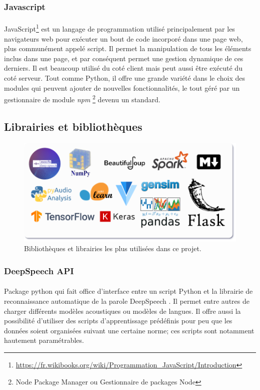 		\subsubsection*{Javascript} 
		\paragraph{}
		JavaScript\footnote{\url{https://fr.wikibooks.org/wiki/Programmation_JavaScript/Introduction}} est un langage de programmation utilisé principalement par les navigateurs web pour exécuter un bout de code incorporé dans une page web, plus communément appelé script. Il permet la manipulation de tous les éléments inclus dans une page, et par conséquent permet une gestion dynamique de ces derniers. Il est beaucoup utilisé du coté client mais peut aussi être exécuté du coté serveur. Tout comme Python, il offre une grande variété dans le choix des modules qui peuvent ajouter de nouvelles fonctionnalités, le tout géré par un gestionnaire de module \textit{npm} \footnote{Node Package Manager ou Gestionnaire de packages Node} devenu un standard.
	
	\subsection{Librairies et bibliothèques}
	\begin{figure}[H] 
		\centering
		\includegraphics[width=0.9\linewidth]{images/implementation/libs_frams.png}
		\caption{Bibliothèques et librairies les plus utilisées dans ce projet.}
		\label{fig:libs_frams}
	\end{figure}
		\subsubsection*{DeepSpeech API}
		\paragraph{}
		Package python qui fait office d'interface entre un script Python et la librairie de reconnaissance automatique de la parole DeepSpeech \citep{deepspeech_paper}. Il permet entre autres de charger différents modèles acoustiques ou modèles de langues. Il offre aussi la possibilité d'utiliser des scripts d'apprentissage prédéfinis pour peu que les données soient organisées suivant une certaine norme; ces scripts sont notamment hautement paramétrables.
